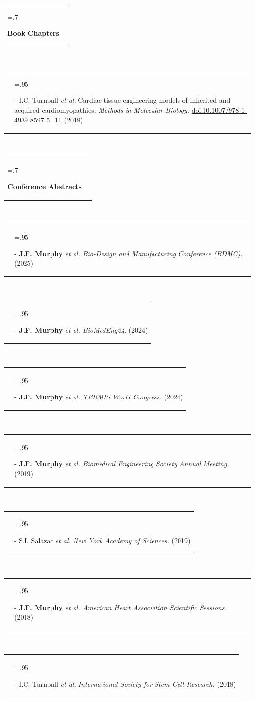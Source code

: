 \documentclass[a4paper,11pt]{article}
\newcommand{\itemitems}[1]{
    \begin{tabularx}{\textwidth} {>{\raggedleft\arraybackslash}X >{\hsize=.95\textwidth\raggedright\arraybackslash}X}
      &- \small#1 \\
    \end{tabularx}
    \\
}
\newcommand{\projHeadings}[2]{
    \begin{tabularx}{\textwidth} {>{\hsize=.7\textwidth\raggedright\arraybackslash}X
   >{\raggedleft\arraybackslash}X}
      #1 & \small#2 \\
    \end{tabularx}
    \\
}
\begin{document}
    \projHeadings{\textbf{Book Chapters}}{}
        \itemitems
            {I.C. Turnbull \emph{et al.} Cardiac tissue engineering models of inherited and acquired cardiomyopathies. \emph{Methods in Molecular Biology.} \href{https://doi.org/10.1007/978-1-4939-8597-5\_11}{doi:10.1007/978-1-4939-8597-5\_11} (2018)}
    \projHeadings{\textbf{Conference Abstracts}}{}
        \itemitems
            {\textbf{J.F. Murphy} \emph{et al. Bio-Design and Manufacturing Conference (BDMC).} (2025)}
        \itemitems
            {\textbf{J.F. Murphy} \emph{et al. BioMedEng24.} (2024)}
        \itemitems
            {\textbf{J.F. Murphy} \emph{et al. TERMIS World Congress.} (2024)}
        \itemitems
            {\textbf{J.F. Murphy} \emph{et al. Biomedical Engineering Society Annual Meeting.} (2019)}
        \itemitems
            {S.I. Salazar \emph{et al. New York Academy of Sciences.} (2019)}
        \itemitems
            {\textbf{J.F. Murphy} \emph{et al. American Heart Association Scientific Sessions.} (2018)}
        \itemitems
            {I.C. Turnbull \emph{et al. International Society for Stem Cell Research.} (2018)}

\end{document}
